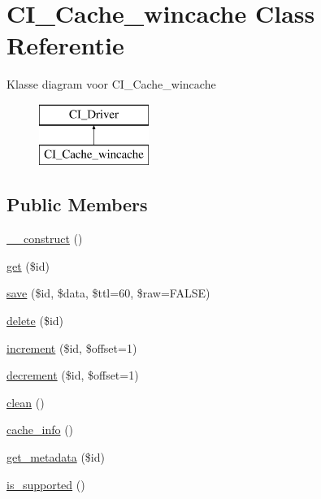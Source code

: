 \hypertarget{class_c_i___cache__wincache}{}\section{C\+I\+\_\+\+Cache\+\_\+wincache Class Referentie}
\label{class_c_i___cache__wincache}
Klasse diagram voor C\+I\+\_\+\+Cache\+\_\+wincache\begin{figure}[H]
\begin{center}
\leavevmode
\includegraphics[height=2.000000cm]{class_c_i___cache__wincache}
\end{center}
\end{figure}
\subsection*{Public Members}
\begin{DoxyCompactItemize}
\item 
\mbox{\hyperlink{class_c_i___cache__wincache_a095c5d389db211932136b53f25f39685}{\+\_\+\+\_\+construct}} ()
\item 
\mbox{\hyperlink{class_c_i___cache__wincache_a50e3bfb586b2f42932a6a93f3fbb0828}{get}} (\$id)
\item 
\mbox{\hyperlink{class_c_i___cache__wincache_a472645db04a8ce4b040b789a3062a7d2}{save}} (\$id, \$data, \$ttl=60, \$raw=F\+A\+L\+SE)
\item 
\mbox{\hyperlink{class_c_i___cache__wincache_a2f8258add505482d7f00ea26493a5723}{delete}} (\$id)
\item 
\mbox{\hyperlink{class_c_i___cache__wincache_a2f07a4e09b57f4460d49852497d1808f}{increment}} (\$id, \$offset=1)
\item 
\mbox{\hyperlink{class_c_i___cache__wincache_a4eb1c2772c8efc48c411ea060dd040b7}{decrement}} (\$id, \$offset=1)
\item 
\mbox{\hyperlink{class_c_i___cache__wincache_adb40b812890a8bc058bf6b7a0e1a54d9}{clean}} ()
\item 
\mbox{\hyperlink{class_c_i___cache__wincache_acb4742926a6fa901e4f0917e1a35ef4c}{cache\+\_\+info}} ()
\item 
\mbox{\hyperlink{class_c_i___cache__wincache_a59635cf18e997c5141bffa05ff7622e0}{get\+\_\+metadata}} (\$id)
\item 
\mbox{\hyperlink{class_c_i___cache__wincache_a98c68fd153468bc148c4ed8c716859fc}{is\+\_\+supported}} ()
\end{DoxyCompactItemize}
